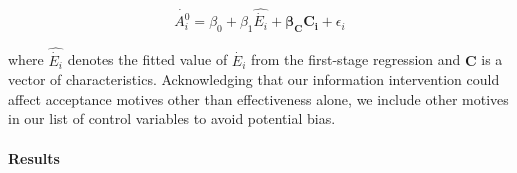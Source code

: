 \documentclass[12pt]{article} %
\begin{document}
\vspace{-.6cm}

\begin{equation}
    \dot{A^0_i} = \beta_0 + \beta_1 \widehat{\dot{E_i}} + \mathbf{\beta_C C_i} + \epsilon_i
    \label{eq:second_stage_parametric_rdd_approve_effective}
\end{equation}

\vspace{.2cm}

\noindent
where $\widehat{\dot{E_i}}$ denotes the fitted value of $\dot{E_i}$ from the first-stage regression and $\textbf{C}$ is a vector of characteristics. Acknowledging that our information intervention could affect acceptance motives other than effectiveness alone, we include other motives in our list of control variables to avoid potential bias. %

\paragraph{Results}
\end{document}
